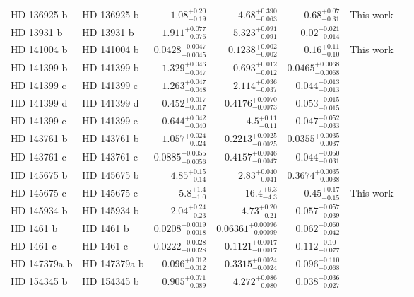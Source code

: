 \begin{longtable*}{llrrrrr}
HD 136925 b & HD 136925 b & $1.08^{+0.20}_{-0.19}$ & $4.68^{+0.390}_{-0.063}$ & $0.68^{+0.07}_{-0.31}$ & This work & \\ 
HD 13931 b & HD 13931 b & $1.911^{+0.077}_{-0.076}$ & $5.323^{+0.091}_{-0.091}$ & $0.02^{+0.021}_{-0.014}$ & \cite{Howard10} & \\ 
HD 141004 b & HD 141004 b & $0.0428^{+0.0047}_{-0.0045}$ & $0.1238^{+0.002}_{-0.002}$ & $0.16^{+0.11}_{-0.10}$ & This work & \\ 
HD 141399 b & HD 141399 b & $1.329^{+0.046}_{-0.047}$ & $0.693^{+0.012}_{-0.012}$ & $0.0465^{+0.0068}_{-0.0068}$ & \cite{Vogt14} & \\ 
HD 141399 c & HD 141399 c & $1.263^{+0.047}_{-0.048}$ & $2.114^{+0.036}_{-0.037}$ & $0.044^{+0.013}_{-0.013}$ & \cite{Vogt14} & \\ 
HD 141399 d & HD 141399 d & $0.452^{+0.017}_{-0.017}$ & $0.4176^{+0.0070}_{-0.0073}$ & $0.053^{+0.015}_{-0.015}$ & \cite{Vogt14} & \\ 
HD 141399 e & HD 141399 e & $0.644^{+0.042}_{-0.040}$ & $4.5^{+0.11}_{-0.11}$ & $0.047^{+0.052}_{-0.033}$ & \cite{Vogt14} & \\ 
HD 143761 b & HD 143761 b & $1.057^{+0.024}_{-0.024}$ & $0.2213^{+0.0025}_{-0.0025}$ & $0.0355^{+0.0035}_{-0.0037}$ & \cite{Noyes97} & \\ 
HD 143761 c & HD 143761 c & $0.0885^{+0.0055}_{-0.0056}$ & $0.4157^{+0.0046}_{-0.0047}$ & $0.044^{+0.050}_{-0.031}$ & \cite{Fulton16} & \\ 
HD 145675 b & HD 145675 b & $4.85^{+0.15}_{-0.14}$ & $2.83^{+0.040}_{-0.041}$ & $0.3674^{+0.0035}_{-0.0038}$ & \cite{Wittenmyer07} & \\ 
HD 145675 c & HD 145675 c & $5.8^{+1.4}_{-1.0}$ & $16.4^{+9.3}_{-4.3}$ & $0.45^{+0.17}_{-0.15}$ & This work & \\ 
HD 145934 b & HD 145934 b & $2.04^{+0.24}_{-0.23}$ & $4.73^{+0.20}_{-0.21}$ & $0.057^{+0.057}_{-0.039}$ & \cite{Feng15} & \\ 
HD 1461 b & HD 1461 b & $0.0208^{+0.0019}_{-0.0018}$ & $0.06361^{+0.00096}_{-0.00099}$ & $0.062^{+0.060}_{-0.042}$ & \cite{Rivera10} & \\ 
HD 1461 c & HD 1461 c & $0.0222^{+0.0028}_{-0.0028}$ & $0.1121^{+0.0017}_{-0.0017}$ & $0.112^{+0.10}_{-0.077}$ & \cite{Diaz16} & \\ 
HD 147379a b & HD 147379a b & $0.096^{+0.012}_{-0.012}$ & $0.3315^{+0.0024}_{-0.0024}$ & $0.096^{+0.110}_{-0.068}$ & \cite{Reiners18} & \\ 
HD 154345 b & HD 154345 b & $0.905^{+0.071}_{-0.089}$ & $4.272^{+0.086}_{-0.080}$ & $0.038^{+0.036}_{-0.027}$ & \cite{Wright08} & \\ 

\end{longtable*}
